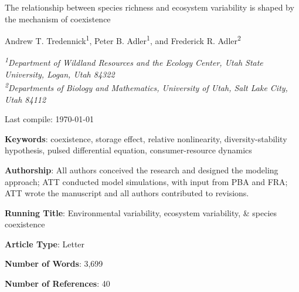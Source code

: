 \documentclass[12pt,]{article}
\title{}
\author{}
\date{}
\begin{document}
\maketitle


\renewcommand\linenumberfont{\normalfont\tiny\sffamily\color{gray}}

\newcommand{\tc}{\textcolor}

\begin{singlespace}

\begin{centering}

\Large{The relationship between species richness and ecosystem variability is shaped by the mechanism of coexistence}

\vspace{2.5em}

\renewcommand*{\thefootnote}{\fnsymbol{footnote}}

\normalsize{Andrew T. Tredennick\textsuperscript{1}, Peter B. Adler\textsuperscript{1}, and Frederick R. Adler\textsuperscript{2}}

\vspace{1.5em}

\textit{\small{\textsuperscript{1}Department of Wildland Resources and the Ecology Center, Utah State University, Logan, Utah 84322}} \\
\textit{\small{\textsuperscript{2}Departments of Biology and Mathematics, University of Utah, Salt Lake City, Utah 84112}} 

\end{centering}

\vspace{3em}

Last compile: \today

\noindent \textbf{Keywords}: coexistence, storage effect, relative nonlinearity, diversity-stability hypothesis, pulsed differential equation, consumer-resource dynamics

\noindent \textbf{Authorship}: All authors conceived the research and designed the modeling approach; ATT conducted model simulations, with input from PBA and FRA; ATT wrote the manuscript and all authors contributed to revisions.

\noindent \textbf{Running Title}: Environmental variability, ecosystem variability, \& species coexistence

\noindent \textbf{Article Type}: Letter

\noindent \textbf{Number of Words}: 3,699

\noindent \textbf{Number of References}: 40


\end{singlespace}
\end{document}
